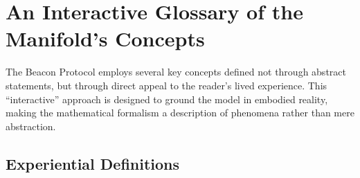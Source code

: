 \documentclass[11pt,a4paper]{article}
\begin{document}



\clearpage
\appendix

\section{An Interactive Glossary of the Manifold's Concepts}
\label{app:interactive_glossary}

The Beacon Protocol employs several key concepts defined not through abstract statements, but through direct appeal to the reader's lived experience. This ``interactive'' approach is designed to ground the model in embodied reality, making the mathematical formalism a description of phenomena rather than mere abstraction.

\subsection*{Experiential Definitions}
\end{document}
